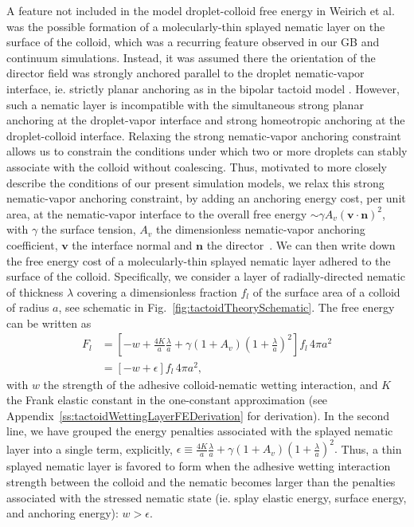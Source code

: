 \documentclass[%
 aip,
 amsmath,amssymb,
 reprint,%
]{revtex4-1}
\begin{document}
A feature not included in the model droplet-colloid free energy in Weirich et al.~\cite{Weirich19} was the possible formation of a molecularly-thin splayed nematic layer on the surface of the colloid, which was a recurring feature observed in our GB and continuum simulations. Instead, it was assumed there the orientation of the director field  was strongly anchored parallel to the droplet nematic-vapor interface, ie. strictly  planar anchoring as in the bipolar tactoid model \cite{vdS03, Taraskin02}. However, such a nematic layer is incompatible with the simultaneous strong planar anchoring at the droplet-vapor interface and strong homeotropic anchoring at the droplet-colloid interface. Relaxing the strong nematic-vapor anchoring constraint allows us to constrain the conditions under which two or more droplets can stably associate with the colloid without coalescing. Thus, motivated to more closely describe the conditions of our present simulation models, we relax this strong nematic-vapor anchoring constraint, by adding an anchoring energy cost, per unit area, at the nematic-vapor interface to the overall free energy $\sim \gamma A_v \left(\textbf{v}\cdot\textbf{n}\right)^2$, with $\gamma$ the surface tension, $A_v$ the dimensionless nematic-vapor anchoring coefficient, $\textbf{v}$ the interface normal and $\textbf{n}$ the director~\cite{RapiniPapoular69,vdS03}. We can then write down the free energy cost of a molecularly-thin splayed nematic layer adhered to the surface of the colloid. Specifically, we consider a layer of radially-directed nematic of thickness $\lambda$ covering a dimensionless fraction $f_{l}$ of the surface area of a colloid of radius $a$, see schematic in Fig.~\ref{fig:tactoidTheorySchematic}. The free energy can be written as
\begin{equation}
\begin{split}
F_{l} &= \left[-w + \frac{4K}{a}\frac{\lambda}{a} + \gamma\left(1 + A_v\right)\left(1+\frac{\lambda}{a}\right)^2\right] f_{l} \, 4\pi a^2 \\
&= \left[-w + \epsilon\right] f_{l} \, 4\pi a^2,
\end{split} \label{eq:tactoidsWettingLayerF}
\end{equation}
with $w$ the strength of the adhesive colloid-nematic wetting interaction, and $K$ the Frank elastic constant in the one-constant approximation (see Appendix~\ref{ss:tactoidWettingLayerFEDerivation} for derivation). In the second line, we have grouped the energy penalties associated with the splayed nematic layer into a single term, explicitly, $\epsilon  \equiv \frac{4K}{a}\frac{\lambda}{a} + \gamma\left(1 + A_v\right)\left(1+\frac{\lambda}{a}\right)^2.$ Thus, a thin splayed nematic layer is favored to form when the adhesive wetting interaction strength between the colloid and the nematic becomes larger than the penalties associated with the stressed nematic state (ie. splay elastic energy, surface energy, and anchoring energy): $w > \epsilon$.
\end{document}
